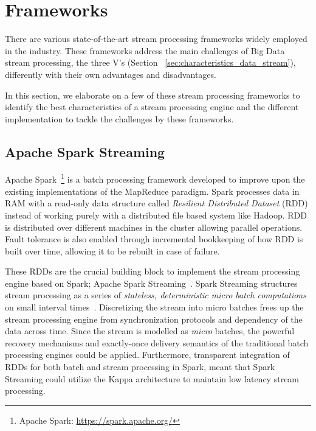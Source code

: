 \section{Frameworks}
\label{sec:frameworks}
There are various state-of-the-art stream processing frameworks widely employed
in the industry. These frameworks address the main challenges of 
Big Data stream processing, the three V's (Section ~\ref{sec:characteristics_data_stream}),
differently with their own advantages and disadvantages.

In this section, we elaborate 
on a few of these stream processing frameworks to identify the best characteristics of a 
stream processing engine and the different implementation to tackle the challenges by these 
frameworks.



\subsection{Apache Spark Streaming}%
\label{sub:Apache Spark}
Apache Spark~\footnote{Apache Spark: \url{https://spark.apache.org/}} is a batch 
processing framework developed to improve upon the existing implementations of the 
MapReduce paradigm. Spark processes data in RAM with a read-only data structure called 
\emph{Resilient Distributed Dataset} (RDD) instead of working purely with a distributed file based system like 
Hadoop. RDD is distributed over 
different machines in the cluster allowing parallel operations. Fault tolerance 
is also enabled through incremental bookkeeping of how RDD is built over time, allowing 
it to be rebuilt in case of failure.

These RDDs are the crucial building block to implement the stream processing engine 
based on Spark; Apache Spark Streaming~\cite{spark_streaming}. Spark Streaming structures
stream processing as a series of \emph{stateless, deterministic micro batch
computations} on small interval times~\cite{spark_streaming}. Discretizing the stream 
into micro batches frees up the stream processing engine from synchronization protocols 
and dependency of the data across time. Since the stream is modelled as \emph{micro} 
batches, the powerful recovery mechanisms and exactly-once delivery semantics of the traditional batch processing engines could
be applied. 
Furthermore, transparent integration of RDDs for both batch and stream processing in Spark,  
meant that Spark Streaming could utilize the Kappa architecture to maintain low latency stream processing. 

